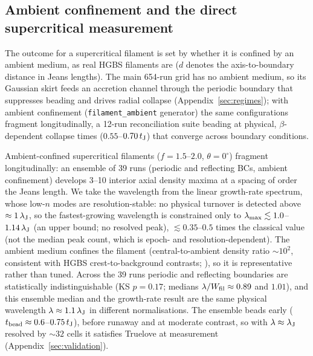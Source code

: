 \documentclass[usenatbib,twoside,twocolumn]{mnras}
\begin{document}
\subsection{Ambient confinement and the direct supercritical measurement}
\label{sec:modecompetition}

The outcome for a supercritical filament is set by whether it is confined by an ambient medium, as real HGBS filaments are ($d$ denotes the axis-to-boundary distance in Jeans lengths). The main 654-run grid has no ambient medium, so its Gaussian skirt feeds an accretion channel through the periodic boundary that suppresses beading and drives radial collapse (Appendix~\ref{sec:regimes}); with ambient confinement (\texttt{filament\_ambient} generator) the same configurations fragment longitudinally, a 12-run reconciliation suite beading at physical, $\beta$-dependent collapse times ($0.55$--$0.70\,t_{\rm J}$) that converge across boundary conditions.

Ambient-confined supercritical filaments ($f=1.5$--$2.0$, $\theta=0^\circ$) fragment longitudinally: an ensemble of 39 runs (periodic and reflecting BCs, ambient confinement) develops 3--10 interior axial density maxima at a spacing of order the Jeans length. We take the wavelength from the linear growth-rate spectrum, whose low-$n$ modes are resolution-stable: no physical turnover is detected above $\approx1\,\lambda_{\rm J}$, so the fastest-growing wavelength is constrained only to $\lambda_{\rm max}\lesssim1.0$--$1.14\,\lambda_{\rm J}$ (an upper bound; no resolved peak), $\lesssim0.35$--$0.5$ times the classical value (not the median peak count, which is epoch- and resolution-dependent). The ambient medium confines the filament (central-to-ambient density ratio $\sim10^2$, consistent with HGBS crest-to-background contrasts; \citealt{Arzoumanian2019}), so it is representative rather than tuned. Across the 39 runs periodic and reflecting boundaries are statistically indistinguishable (KS $p=0.17$; medians $\lambda/W_{\rm fil}\approx0.89$ and $1.01$), and this ensemble median and the growth-rate result are the same physical wavelength $\lambda\approx1.1\,\lambda_{\rm J}$ in different normalisations. The ensemble beads early ($t_{\rm bead}\approx0.6$--$0.75\,t_{\rm J}$), before runaway and at moderate contrast, so with $\lambda\approx\lambda_{\rm J}$ resolved by ${\sim}32$ cells it satisfies Truelove at measurement (Appendix~\ref{sec:validation}).
\end{document}
